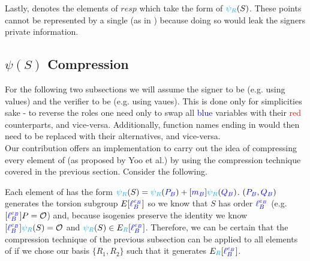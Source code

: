 Lastly,  denotes the elements of $resp$ which take the form of $\textcolor{cyan}{\psi_R}(S)$. These points cannot be represented by a single  (as in ) because doing so would leak the signers private information.\\

\subsection{$\psi(S)$ Compression}

For the following two subsections we will assume the signer to be \bob (e.g. using \rb values) and the verifier to be \alice (e.g. using \ba vaues). This is done only for simplicities sake - to reverse the roles one need only to swap all \textcolor{blue}{blue} variables with their \textcolor{red}{red} counterparts, and vice-versa. Additionally, function names ending in  would then need to be replaced with their  alternatives, and vice-versa.\\

\noindent
Our contribution offers an implementation to carry out the idea of compressing every element of  (as proposed by Yoo et al.) by using the compression technique covered in the previous section. Consider the following.

Each element of  has the form $\textcolor{cyan}{\psi_R}(S) = \textcolor{cyan}{\psi_R}(\textcolor{blue}{P_B}) + [\textcolor{blue}{m_B}]\textcolor{cyan}{\psi_R}(\textcolor{blue}{Q_B})$. $(\textcolor{blue}{P_B}, \textcolor{blue}{Q_B})$ generates the torsion subgroup $E[\textcolor{blue}{\ell_{B}^{e_B}}]$ so we know that $S$ has order $\textcolor{blue}{\ell_{B}^{e_B}}$ (e.g. $[\textcolor{blue}{\ell_{B}^{e_B}}]P = \mathcal{O}$) and, because isogenies preserve the identity we know $[\textcolor{blue}{\ell_{B}^{e_B}}]\textcolor{cyan}{\psi_R}(S) = \mathcal{O}$ and $\textcolor{cyan}{\psi_R}(S) \in E_{\textcolor{cyan}{R}}[\textcolor{blue}{\ell_{B}^{e_B}}]$. Therefore, we can be certain that the compression technique of the previous subsection can be applied to all elements of  if we chose our basis $\{R_1, R_2\}$ such that it generates $E_{\textcolor{cyan}{R}}[\textcolor{blue}{\ell_{B}^{e_B}}]$.

